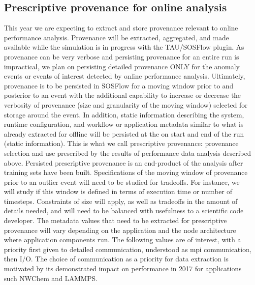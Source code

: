 \subsection{Prescriptive provenance for online analysis}
This year we are expecting to extract and store provenance relevant to online performance analysis.  Provenance will be extracted, aggregated, and made available while the simulation is in progress with the TAU/SOSFlow plugin.  As provenance can be very verbose and persisting provenance for an entire run is impractical, we plan on persisting detailed provenance ONLY for the anomaly events or events of interest detected by online performance analysis.  Ultimately, provenance is to be persisted in SOSFlow for a moving window prior to and posterior to an event with the additional capability to increase or decrease the verbosity of provenance (size and granularity of the moving window) selected for storage around the event.  In addition, static information describing the system, runtime configuration, and  workflow or application metadata similar to what is already extracted for offline will be persisted at the on start and end of the run (static information).  This is what we call prescriptive provenance: provenance selection and use prescribed by the results of performance data analysis described above.  Persisted prescriptive provenance is an end-product of the analysis after training sets have been built.
Specifications of the moving window of provenance prior to an outlier event will need to be studied for tradeoffs.  For instance, we will study if this window is defined in terms of execution time or number of timesteps.  Constraints of size will apply, as well as tradeoffs in the amount of details needed, and will need to be balanced with usefulness to a scientific code developer.
The metadata values that need to be extracted for prescriptive provenance will vary depending on the application and the node architecture where application components run.  The following values are of interest, with a priority first given to detailed communication, understood as mpi communication, then I/O.  The choice of communication as a priority for data extraction is motivated by its demonstrated impact on performance in 2017 for applications such NWChem and LAMMPS. 